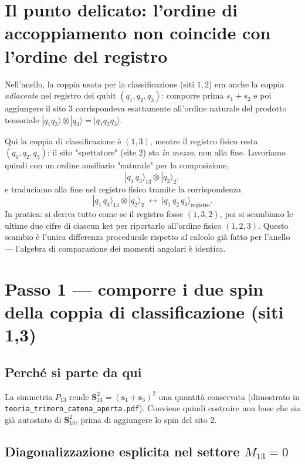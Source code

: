 \documentclass[11pt,a4paper]{article}
\begin{document}
\section{Il punto delicato: l'ordine di accoppiamento non coincide con l'ordine del registro}
\label{sec:riordino}

Nell'anello, la coppia usata per la classificazione (siti $1,2$) era anche
la coppia \emph{adiacente} nel registro dei qubit $(q_1,q_2,q_3)$: comporre
prima $s_1+s_2$ e poi aggiungere il sito $3$ corrispondeva esattamente
all'ordine naturale del prodotto tensoriale $|q_1q_2\rangle\otimes|q_3\rangle=|q_1q_2q_3\rangle$.

Qui la coppia di classificazione è $(1,3)$, mentre il registro fisico resta
$(q_1,q_2,q_3)$: il sito "spettatore" (site $2$) sta \emph{in mezzo}, non
alla fine. Lavoriamo quindi con un ordine ausiliario "naturale" per la
composizione,
\begin{equation}
|q_1\,q_3\rangle_{13}\otimes|q_2\rangle_2 ,
\end{equation}
e traduciamo alla fine nel registro fisico tramite la corrispondenza
\begin{equation}
|q_1\,q_3\rangle_{13}\otimes|q_2\rangle_2 \;\longleftrightarrow\; |q_1\,q_2\,q_3\rangle_{\text{registro}} .
\label{eq:riordino}
\end{equation}
In pratica: si deriva tutto come se il registro fosse $(1,3,2)$, poi si
scambiano le ultime due cifre di ciascun ket per riportarlo all'ordine
fisico $(1,2,3)$. Questo scambio è l'unica differenza procedurale rispetto
al calcolo già fatto per l'anello — l'algebra di comparazione dei momenti
angolari è identica.

\section{Passo 1 — comporre i due spin della coppia di classificazione (siti 1,3)}

\subsection{Perché si parte da qui}

La simmetria $P_{13}$ rende $\mathbf S_{13}^2=(\mathbf s_1+\mathbf s_3)^2$ una
quantità conservata (dimostrato in \texttt{teoria\_trimero\_catena\_aperta.pdf}).
Conviene quindi costruire una base che sia già autostato di
$\mathbf S_{13}^2$, prima di aggiungere lo spin del sito $2$.

\subsection{Diagonalizzazione esplicita nel settore $M_{13}=0$}
\end{document}
